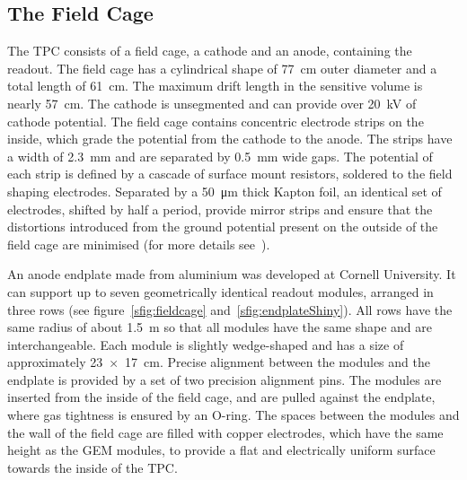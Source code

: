 \documentclass[preprint]{elsarticle}
\begin{document}
\subsection{The Field Cage}
\label{sec:fieldcage}
The TPC consists of a field cage, a cathode and an anode, containing the readout. The field cage has a cylindrical shape of \SI{77}{\cm} outer diameter and a total length of \SI{61}{\cm}. The maximum drift length in the sensitive volume is nearly \SI{57}{\cm}. The cathode is unsegmented and can provide over \SI{20}{kV} of cathode potential. The field cage contains concentric electrode strips on the inside, which grade the potential from the cathode to the anode. The strips have a width of \SI{2.3}{\mm} and are separated by \SI{0.5}{\mm} wide gaps. The potential of each strip is defined by a cascade of surface mount resistors, soldered to the field shaping electrodes. Separated by a \SI{50}{\um} thick Kapton\textsuperscript{\textregistered} foil, an identical set of electrodes, shifted by half a period, provide mirror strips and ensure that the distortions introduced from the ground potential present on the outside of the field cage are minimised (for more details see~\cite{Schade}). 

An anode endplate made from aluminium was developed at Cornell University. It can support up to seven geometrically identical readout modules, arranged in three rows (see figure~\ref{sfig:fieldcage} and~\ref{sfig:endplateShiny}). All rows have the same radius of about \SI{1.5}{\m} so that all modules have the same shape and are interchangeable. Each module is slightly wedge-shaped and has a size of approximately \SI{23 x 17}{\cm}.  Precise alignment between the modules and the endplate is provided by a set of two precision alignment pins. The modules are inserted from the inside of the field cage, and are pulled against the endplate, where gas tightness is ensured by an O-ring. The spaces between the modules and the wall of the field cage are filled with copper electrodes, which have the same height as the GEM modules, to provide a flat and electrically uniform surface towards the inside of the TPC.
\end{document}

